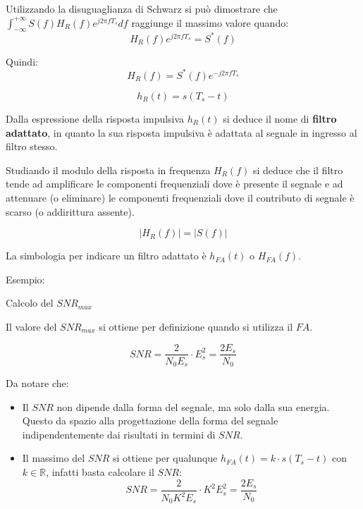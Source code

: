 Utilizzando la disuguaglianza di Schwarz si può dimostrare che $\int_{-\infty}^{+\infty} S(f) H_R(f) e^{j2\pi fT_s} df$ raggiunge il massimo valore quando:
\[
    H_R(f) e^{j2\pi fT_s} = S^*(f)
\]

Quindi:
\[
    H_R(f) = S^*(f) e^{-j2\pi fT_s}
\]

\[
    \boxed{h_R(t) = s(T_s - t)}
\]

Dalla espressione della risposta impulsiva \( h_R(t) \) si deduce il nome di \textbf{filtro adattato}, in quanto la sua risposta impulsiva è adattata al segnale in ingresso al filtro stesso.



Studiando il modulo della risposta in frequenza \( H_R(f) \) si deduce che il filtro tende ad amplificare le componenti frequenziali dove è presente il segnale e ad attenuare (o eliminare) le componenti frequenziali dove il contributo di segnale è scarso (o addirittura assente).

\[
    \left| H_R(f) \right| = \left| S(f) \right|
\]

La simbologia per indicare un filtro adattato è \( h_{FA}(t) \) o \( H_{FA}(f) \).

Esempio:


Calcolo del \( SNR_{max} \)

Il valore del \( SNR_{max} \) si ottiene per definizione quando si utilizza il \( FA \).

\[
    SNR = \frac{2}{N_0 E_s} \cdot E_s^2 = \frac{2E_s}{N_0}
\]

Da notare che:

\begin{itemize}
    \item Il \( SNR \) non dipende dalla forma del segnale, ma solo dalla sua energia. Questo da spazio alla progettazione della forma del segnale indipendentemente dai risultati in termini di \( SNR \).
    \item Il massimo del \( SNR \) si ottiene per qualunque \( h_{FA}(t) = k \cdot s(T_s-t) \) con \( k \in \mathbb{R} \), infatti basta calcolare il $SNR$:
          \[ SNR = \frac{2}{N_0K^2 E_s} \cdot K^2 E_s^2 = \frac{2 E_s}{N_0} \]
\end{itemize}


